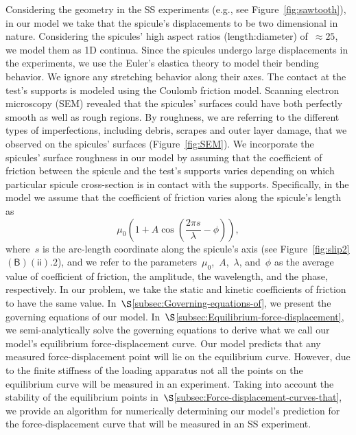 \documentclass[preprint,10pt,times]{elsarticle}
\numberwithin{equation}{section}
\newcommand{\pr}[1]{\left( #1 \right)}
\newcommand{\subf}[1]{\pr{\textsf{#1}}}
\begin{document}
Considering the geometry in the SS experiments\textcolor{violet}{{}
}(e.g., see Figure~\ref{fig:sawtooth}), in our model we take that
the spicule's displacements to be two dimensional in nature. Considering
the spicules' high aspect ratios (length:diameter) of~$\approx 25$,
we model them as 1D continua. Since the spicules undergo large displacements
in the experiments, we use the Euler's elastica theory to model their
bending behavior. We ignore any stretching behavior along their axes.
The contact at the test's supports is modeled using the Coulomb friction
model. Scanning electron microscopy (SEM) revealed that the spicules'
surfaces could have both perfectly smooth as well as rough regions.
By roughness, we are referring to the different types of imperfections,
including debris, scrapes and outer layer damage, that we observed
on the spicules' surfaces (Figure~\ref{fig:SEM}). We incorporate
the spicules' surface roughness in our model by assuming that the
coefficient of friction between the spicule and the test's supports
varies depending on which particular spicule cross-section is in contact
with the supports. Specifically, in the model we assume that the coefficient
of friction varies along the spicule's length  as
\begin{equation}
\mu_{0}\left(1+A\cos\left(\frac{ 2 \pi s}{\lambda}-\phi\right)\right),\label{eq:muofS1}
\end{equation}
where~$s$ is the arc-length coordinate along the spicule's axis
(see Figure~\ref{fig:slip2}$\subf{B}$$\subf{ii}.2$), and we refer
to the parameters~$\mu_0$,~$A$,~$\lambda$, and~$\phi$ as the
average value of coefficient of friction, the amplitude, the wavelength,
and the phase, respectively. In our problem, we take the static and
kinetic coefficients of friction to have the same value. In~$\S$\ref{subsec:Governing-equations-of},
we present the governing equations of our model. In~$\S$\ref{subsec:Equilibrium-force-displacement},
we semi-analytically solve the governing equations to derive what
we call our model's equilibrium force-displacement curve. Our model
predicts that any measured force-displacement point will lie on the
equilibrium curve. However, due to the finite stiffness of the loading
apparatus not all the points on the equilibrium curve will be measured
in an experiment. Taking into account the stability of the equilibrium
points in~$\S$\textcolor{violet}{\ref{subsec:Force-displacement-curves-that}},
we provide an algorithm for numerically determining our model's prediction
for the force-displacement curve that will be measured in an SS experiment.
\end{document}
